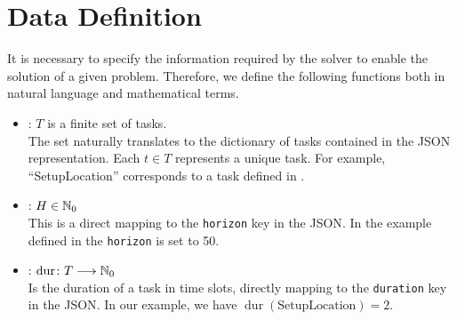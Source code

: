 \section{Data Definition}
\label{sec:formal-framework:data-definition}
It is necessary to specify the information required by the solver to enable the solution of a given problem. Therefore, we define the following functions both in natural language and mathematical terms.
\begin{itemize}
      \item {}: $T$ is a finite set of tasks. \\
            The set naturally translates to the dictionary of tasks contained in the
            \ac{JSON} representation. Each $t \in T$ represents a unique task.
            For example, ``SetupLocation'' corresponds to a task defined in
            .

      \item {}: $H \in \mathbb{N}_0$ \\
            This is a direct mapping to the \texttt{horizon} key in the \ac{JSON}. In the example defined in  the \texttt{horizon} is set to 50.

      \item {}: $\operatorname{dur} \colon T \longrightarrow \mathbb{N}_0$\\
            Is the duration of a task in time slots, directly mapping to the \texttt{duration} key in the \ac{JSON}. In our example, we have $\operatorname{dur}(\text{SetupLocation}) = 2$.


\end{itemize}
